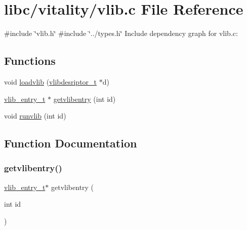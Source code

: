 \hypertarget{a00167}{}\section{libc/vitality/vlib.c File Reference}
\label{a00167}
{\ttfamily \#include \char`\"{}vlib.\+h\char`\"{}}\newline
{\ttfamily \#include \char`\"{}../types.\+h\char`\"{}}\newline
Include dependency graph for vlib.\+c\+:
\subsection*{Functions}
\begin{DoxyCompactItemize}
\item 
void \hyperlink{a00167_aee69008de31826f28854c29a54cb315e_aee69008de31826f28854c29a54cb315e}{loadvlib} (\hyperlink{a00170_a2d9000b4fbb25c5ed2950a2d8f4921d5_a2d9000b4fbb25c5ed2950a2d8f4921d5}{vlibdesriptor\+\_\+t} $\ast$d)
\item 
\hyperlink{a00170_a97c1a7136f2ab06368e93c2d7533d619_a97c1a7136f2ab06368e93c2d7533d619}{vlib\+\_\+entry\+\_\+t} $\ast$ \hyperlink{a00167_aeeb1b55b301de7b4c7aa360c387c3ef9_aeeb1b55b301de7b4c7aa360c387c3ef9}{getvlibentry} (int id)
\item 
void \hyperlink{a00167_a6889af26c1cca94090023d5975955cbf_a6889af26c1cca94090023d5975955cbf}{runvlib} (int id)
\end{DoxyCompactItemize}


\subsection{Function Documentation}
\mbox{\label{a00167_aeeb1b55b301de7b4c7aa360c387c3ef9_aeeb1b55b301de7b4c7aa360c387c3ef9}} 
\subsubsection{\texorpdfstring{getvlibentry()}{getvlibentry()}}
{\footnotesize\ttfamily \hyperlink{a00170_a97c1a7136f2ab06368e93c2d7533d619_a97c1a7136f2ab06368e93c2d7533d619}{vlib\+\_\+entry\+\_\+t}$\ast$ getvlibentry (\begin{DoxyParamCaption}\item[{int}]{id }\end{DoxyParamCaption})}



